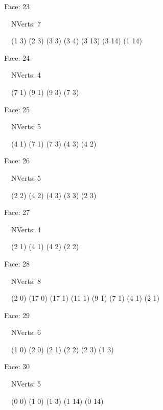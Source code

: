 \documentclass{article}
\begin{document}
{\footnotesize 

Face: 23

\   \    NVerts: 7

 \   \   (1 3) (2 3) (3 3) (3 4) (3 13) (3 14) (1 14)}

{\footnotesize 

Face: 24

\   \    NVerts: 4

 \   \   (7 1) (9 1) (9 3) (7 3)}

{\footnotesize 

Face: 25

\   \    NVerts: 5

 \   \   (4 1) (7 1) (7 3) (4 3) (4 2)}

{\footnotesize 

Face: 26

\   \    NVerts: 5

 \   \   (2 2) (4 2) (4 3) (3 3) (2 3)}

{\footnotesize 

Face: 27

\   \    NVerts: 4

 \   \   (2 1) (4 1) (4 2) (2 2)}

{\footnotesize 

Face: 28

\   \    NVerts: 8

 \   \   (2 0) (17 0) (17 1) (11 1) (9 1) (7 1) (4 1) (2 1)}

{\footnotesize 

Face: 29

\   \    NVerts: 6

 \   \   (1 0) (2 0) (2 1) (2 2) (2 3) (1 3)}

{\footnotesize 

Face: 30

\   \    NVerts: 5

 \   \   (0 0) (1 0) (1 3) (1 14) (0 14)}


 \newpage
\end{document}
